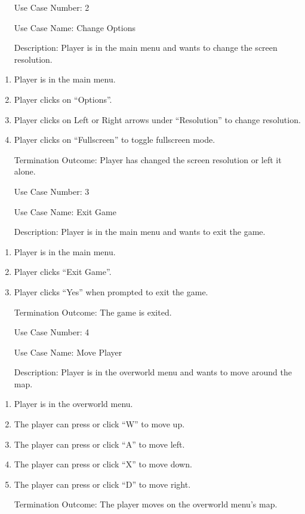 \documentclass[10pt,conference,onecolumn,compsoc]{IEEEtran}
\begin{document}
\begin{itemize}
\item[Use Case Number:] 2
\item[Use Case Name:] Change Options
\item[Description:] Player is in the main menu and wants to change the screen resolution.
\end{itemize}
\begin{enumerate}
\item Player is in the main menu.
\item Player clicks on “Options”.
\item Player clicks on Left or Right arrows under “Resolution” to change resolution.
\item Player clicks on “Fullscreen” to toggle fullscreen mode.
\item [Termination Outcome:] Player has changed the screen resolution or left it alone.
\end{enumerate}

\begin{itemize}
\item[Use Case Number:] 3
\item[Use Case Name:] Exit Game
\item[Description:] Player is in the main menu and wants to exit the game.
\end{itemize}
\begin{enumerate}
\item Player is in the main menu.
\item Player clicks “Exit Game”.
\item Player clicks “Yes” when prompted to exit the game.
\item [Termination Outcome:] The game is exited.
\end{enumerate}

\begin{itemize}
\item[Use Case Number:] 4
\item[Use Case Name:] Move Player
\item[Description:] Player is in the overworld menu and wants to move around the map.
\end{itemize}
\begin{enumerate}
\item Player is in the overworld menu.
\item The player can press or click “W” to move up.
\item The player can press or click “A” to move left.
\item The player can press or click “X” to move down.
\item The player can press or click “D” to move right.
\item [Termination Outcome:] The player moves on the overworld menu's map.
\end{enumerate}
\end{document}
